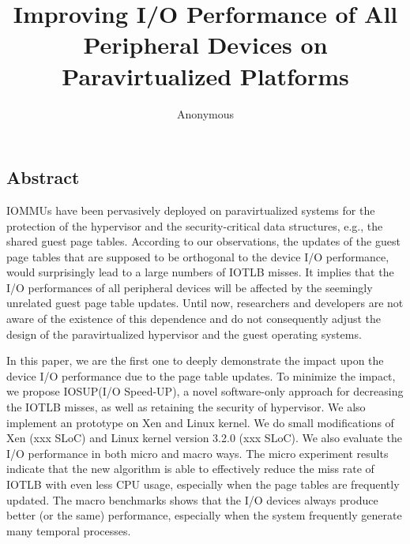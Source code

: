 \documentclass[pageno]{jpaper}
\begin{document}
\newcommand{\asplossubmissionnumber}{xxx}
\newcommand{\mypara}[1]{\vspace{2pt}\noindent\textbf{{#1. }}}
\newcommand{\name}{IOSUP\xspace}
\newcommand{\eat}[1]{}  %

\newcommand{\authcomment}[3]{\ding{110}\ding{43}\textcolor{#3}{#1 says: #2}}
\newcommand{\yueqiang}[1]{\authcomment{Yueqiang}{#1}{red}}
\newcommand{\zhi}[1]{\authcomment{Zhi}{#1}{red}}
\newcommand{\junqing}[1]{\authcomment{Junqing}{#1}{red}}


\date{}

\title{\Large \bf Improving I/O Performance of All Peripheral Devices on Paravirtualized Platforms}


\author{
{\rm Anonymous}
}%

\maketitle

\thispagestyle{empty}


\subsection*{Abstract}
IOMMUs have been pervasively deployed on paravirtualized systems for the protection of the hypervisor and the security-critical data structures, e.g., the shared guest page tables. According to our observations, the updates of the guest page tables that are supposed to be orthogonal to the device I/O performance, would surprisingly lead to a large numbers of IOTLB misses. It implies that the I/O performances of all peripheral devices will be affected by the seemingly unrelated guest page table updates. Until now, researchers and developers are not aware of the existence of this dependence and do not consequently adjust the design of the paravirtualized hypervisor and the guest operating systems.

In this paper, we are the first one to deeply demonstrate the impact upon the device I/O performance due to the page table updates. To minimize the impact, we propose \name(I/O Speed-UP), a novel software-only approach for decreasing the IOTLB misses, as well as retaining the security of hypervisor.
We also implement an prototype on Xen and Linux kernel. We do small modifications of Xen (xxx SLoC) and Linux kernel version 3.2.0 (xxx SLoC). We also evaluate the I/O performance in both micro and macro ways. The micro experiment results indicate that the new algorithm is able to effectively reduce the miss rate of IOTLB with even less CPU usage, especially when the page tables are frequently updated. The macro benchmarks shows that the I/O devices always produce better (or the same) performance, especially when the system frequently generate many temporal processes.
\end{document}

